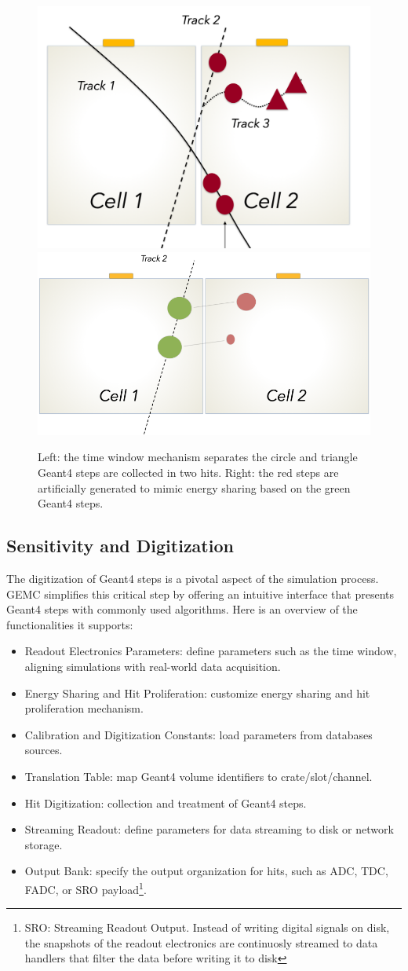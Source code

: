 \begin{figure}[h]
    \centering
    \includegraphics[width=.45\textwidth]{img/tw}
    \includegraphics[width=.54\textwidth]{img/e_sharing}
    \caption{Left: the time window mechanism separates the circle and triangle Geant4 steps are collected in two hits.
    Right: the red steps are artificially generated
    to mimic energy sharing based on the green Geant4 steps.}
    \label{fig:time_window_energy_sharing}
\end{figure}

\subsection{Sensitivity and Digitization}
\label{subsec:digitization}

The digitization of Geant4 steps is a pivotal aspect of the simulation process.
GEMC simplifies this critical step by offering an intuitive interface that presents Geant4 steps
with commonly used algorithms.
Here is an overview of the functionalities it supports:

\begin{itemize}
    \item Readout Electronics Parameters: define parameters such as the time window,
    aligning simulations with real-world data acquisition.
    \item Energy Sharing and Hit Proliferation: customize energy sharing and hit proliferation mechanism.
    \item Calibration and Digitization Constants: load parameters from databases sources.
    \item Translation Table: map Geant4 volume identifiers to crate/slot/channel.
    \item Hit Digitization: collection and treatment of Geant4 steps.
    \item Streaming Readout: define parameters for data streaming to disk or network storage.
    \item Output Bank: specify the output organization for hits, such as ADC, TDC, FADC, or SRO
    payload\footnote{SRO: Streaming Readout Output. Instead of writing digital signals on disk, the
    snapshots of the readout electronics are continuosly streamed to data handlers that filter the
    data before writing it to disk}.
\end{itemize}

